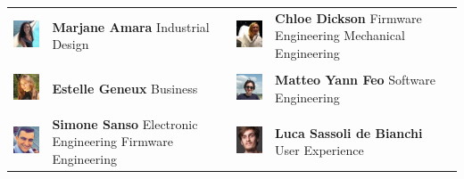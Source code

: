 \vspace{1cm}
\begin{tabular}{m{2cm}m{5cm}m{2cm}m{5cm}}
    
    \includegraphics[width=2cm]{images/icon_marjane.png} & \textbf{Marjane Amara} \newline Industrial Design &
    \includegraphics[width=2cm]{images/icon_chloe.jpg} & \textbf{Chloe Dickson} \newline Firmware Engineering \newline Mechanical Engineering \\
    
     & & & \\
    
    \includegraphics[width=2cm]{images/icon_estelle.jpg} & \textbf{Estelle Geneux} \newline Business &
    \includegraphics[width=2cm]{images/icon_yann.jpg} & \textbf{Matteo Yann Feo} \newline Software Engineering \\
    
     & & & \\
    
    \includegraphics[width=2cm]{images/icon_simone.png} & \textbf{Simone Sanso} \newline Electronic Engineering \newline Firmware Engineering &
    \includegraphics[width=2cm]{images/icon_luca.png} & \textbf{Luca Sassoli de Bianchi} \newline User Experience\\
\end{tabular}


